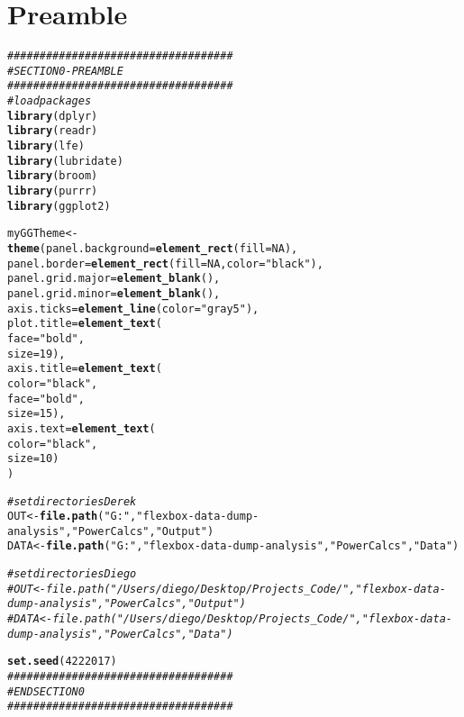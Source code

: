 \documentclass[10pt]{article}\usepackage[]{graphicx}\usepackage[]{color}
\makeatletter
\newcommand{\hlnum}[1]{\textcolor[rgb]{0.686,0.059,0.569}{#1}}%
\newcommand{\hlstr}[1]{\textcolor[rgb]{0.192,0.494,0.8}{#1}}%
\newcommand{\hlcom}[1]{\textcolor[rgb]{0.678,0.584,0.686}{\textit{#1}}}%
\newcommand{\hlstd}[1]{\textcolor[rgb]{0.345,0.345,0.345}{#1}}%
\newcommand{\hlkwb}[1]{\textcolor[rgb]{0.69,0.353,0.396}{#1}}%
\newcommand{\hlkwc}[1]{\textcolor[rgb]{0.333,0.667,0.333}{#1}}%
\newcommand{\hlkwd}[1]{\textcolor[rgb]{0.737,0.353,0.396}{\textbf{#1}}}%
\newenvironment{kframe}{%
 \def\at@end@of@kframe{}%
 \ifinner\ifhmode%
  \def\at@end@of@kframe{\end{minipage}}%
  \begin{minipage}{\columnwidth}%
 \fi\fi%
 \def\FrameCommand##1{\hskip\@totalleftmargin \hskip-\fboxsep
 \colorbox{shadecolor}{##1}\hskip-\fboxsep
     \hskip-\linewidth \hskip-\@totalleftmargin \hskip\columnwidth}%
 \MakeFramed {\advance\hsize-\width
   \@totalleftmargin\z@ \linewidth\hsize
   \@setminipage}}%
 {\par\unskip\endMakeFramed%
 \at@end@of@kframe}
\newenvironment{knitrout}{}{} %
\makeatother
\begin{document}
  \pagestyle{fancy}
    \rhead{\today}
    \addtocounter{section}{-1}
    \section{Preamble}

\begin{knitrout}
\color{fgcolor}\begin{kframe}
\begin{alltt}
\hlcom{###################################}
\hlcom{# SECTION 0 - PREAMBLE}
\hlcom{###################################}
\hlcom{# load packages}
\hlkwd{library}\hlstd{(dplyr)}
\hlkwd{library}\hlstd{(readr)}
\hlkwd{library}\hlstd{(lfe)}
\hlkwd{library}\hlstd{(lubridate)}
\hlkwd{library}\hlstd{(broom)}
\hlkwd{library}\hlstd{(purrr)}
\hlkwd{library}\hlstd{(ggplot2)}

\hlstd{myGGTheme} \hlkwb{<-}
  \hlkwd{theme}\hlstd{(}\hlkwc{panel.background} \hlstd{=} \hlkwd{element_rect}\hlstd{(}\hlkwc{fill} \hlstd{=} \hlnum{NA}\hlstd{),}
  \hlkwc{panel.border} \hlstd{=} \hlkwd{element_rect}\hlstd{(}\hlkwc{fill} \hlstd{=} \hlnum{NA}\hlstd{,} \hlkwc{color} \hlstd{=} \hlstr{"black"}\hlstd{),}
  \hlkwc{panel.grid.major} \hlstd{=} \hlkwd{element_blank}\hlstd{(),}
  \hlkwc{panel.grid.minor} \hlstd{=} \hlkwd{element_blank}\hlstd{(),}
  \hlkwc{axis.ticks} \hlstd{=} \hlkwd{element_line}\hlstd{(}\hlkwc{color} \hlstd{=} \hlstr{"gray5"}\hlstd{),}
  \hlkwc{plot.title} \hlstd{=} \hlkwd{element_text}\hlstd{(}
   \hlkwc{face}\hlstd{=}\hlstr{"bold"}\hlstd{,}
   \hlkwc{size}\hlstd{=}\hlnum{19}\hlstd{),}
  \hlkwc{axis.title} \hlstd{=} \hlkwd{element_text}\hlstd{(}
   \hlkwc{color}\hlstd{=}\hlstr{"black"}\hlstd{,}
   \hlkwc{face}\hlstd{=}\hlstr{"bold"}\hlstd{,}
   \hlkwc{size}\hlstd{=}\hlnum{15}\hlstd{),}
  \hlkwc{axis.text} \hlstd{=} \hlkwd{element_text}\hlstd{(}
   \hlkwc{color}\hlstd{=}\hlstr{"black"}\hlstd{,}
   \hlkwc{size}\hlstd{=}\hlnum{10}\hlstd{)}
\hlstd{)}

\hlcom{# set directories Derek}
\hlstd{OUT}  \hlkwb{<-} \hlkwd{file.path}\hlstd{(}\hlstr{"G:"}\hlstd{,}\hlstr{"flexbox-data-dump-analysis"}\hlstd{,}\hlstr{"PowerCalcs"}\hlstd{,}\hlstr{"Output"}\hlstd{)}
\hlstd{DATA} \hlkwb{<-} \hlkwd{file.path}\hlstd{(}\hlstr{"G:"}\hlstd{,}\hlstr{"flexbox-data-dump-analysis"}\hlstd{,}\hlstr{"PowerCalcs"}\hlstd{,}\hlstr{"Data"}\hlstd{)}

\hlcom{# set directories Diego}
\hlcom{#OUT  <- file.path("/Users/diego/Desktop/Projects_Code/","flexbox-data-dump-analysis","PowerCalcs","Output")}
\hlcom{#DATA <- file.path("/Users/diego/Desktop/Projects_Code/","flexbox-data-dump-analysis","PowerCalcs","Data")}

\hlkwd{set.seed}\hlstd{(}\hlnum{4222017}\hlstd{)}
\hlcom{###################################}
\hlcom{# END SECTION 0}
\hlcom{###################################}
\end{alltt}
\end{kframe}
\end{knitrout}
\end{document}
